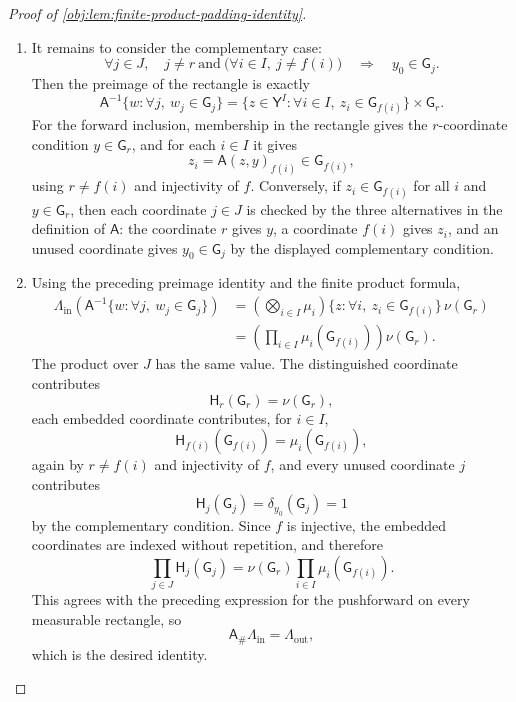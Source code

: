 \begin{proof}[Proof of \cref{obj:lem:finite-product-padding-identity}]
\begin{enumerate}
\item
It remains to consider the complementary case:
\[
\forall j\in J,\quad
j\ne r\ \text{and}\ \bigl(\forall i\in I,\ j\ne f(i)\bigr)
\quad\Longrightarrow\quad
y_0\in\mathsf G_j .
\]
Then the preimage of the rectangle is exactly
\[
\mathsf A^{-1}\{w:\forall j,\ w_j\in\mathsf G_j\}
=
\{z\in\mathsf Y^I:\forall i\in I,\ z_i\in\mathsf G_{f(i)}\}
\times \mathsf G_r .
\]
For the forward inclusion, membership in the rectangle gives the \(r\)-coordinate condition
\(y\in\mathsf G_r\), and for each \(i\in I\) it gives
\[
z_i=\mathsf A(z,y)_{f(i)}\in\mathsf G_{f(i)},
\]
using \(r\ne f(i)\) and injectivity of \(f\). Conversely, if \(z_i\in\mathsf G_{f(i)}\) for all
\(i\) and \(y\in\mathsf G_r\), then each coordinate \(j\in J\) is checked by the three alternatives
in the definition of \(\mathsf A\): the coordinate \(r\) gives \(y\), a coordinate \(f(i)\) gives
\(z_i\), and an unused coordinate gives \(y_0\in\mathsf G_j\) by the displayed complementary
condition.

\item
Using the preceding preimage identity and the finite product formula,
\[
\begin{aligned}
\Lambda_{\mathrm{in}}\!\left(\mathsf A^{-1}
  \{w:\forall j,\ w_j\in\mathsf G_j\}\right)
&=
\left(\bigotimes_{i\in I}\mu_i\right)
  \{z:\forall i,\ z_i\in\mathsf G_{f(i)}\}\,
  \nu(\mathsf G_r) \\
&=
\left(\prod_{i\in I}\mu_i(\mathsf G_{f(i)})\right)\nu(\mathsf G_r).
\end{aligned}
\]
The product over \(J\) has the same value. The distinguished coordinate contributes
\[
\mathsf H_r(\mathsf G_r)=\nu(\mathsf G_r),
\]
each embedded coordinate contributes, for \(i\in I\),
\[
\mathsf H_{f(i)}(\mathsf G_{f(i)})=\mu_i(\mathsf G_{f(i)}),
\]
again by \(r\ne f(i)\) and injectivity of \(f\), and every unused coordinate \(j\) contributes
\[
\mathsf H_j(\mathsf G_j)=\delta_{y_0}(\mathsf G_j)=1
\]
by the complementary condition. Since \(f\) is injective, the embedded coordinates are indexed
without repetition, and therefore
\[
\prod_{j\in J}\mathsf H_j(\mathsf G_j)
=
\nu(\mathsf G_r)\prod_{i\in I}\mu_i(\mathsf G_{f(i)}).
\]
This agrees with the preceding expression for the pushforward on every measurable rectangle, so
\[
\mathsf A_\#\Lambda_{\mathrm{in}}=\Lambda_{\mathrm{out}},
\]
which is the desired identity.
\end{enumerate}
\end{proof}
